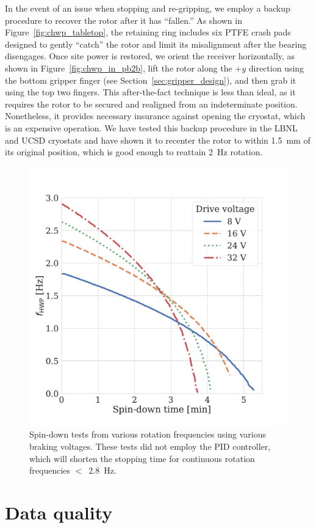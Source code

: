 In the event of an issue when stopping and re-gripping, we employ a backup procedure to recover the rotor after it has ``fallen.'' As shown in Figure~\ref{fig:chwp_tabletop}, the retaining ring includes six PTFE crash pads designed to gently ``catch'' the rotor and limit its misalignment after the bearing disengages. Once site power is restored, we orient the receiver horizontally, as shown in Figure~\ref{fig:chwp_in_pb2b}, lift the rotor along the $+y$ direction using the bottom gripper finger (see Section~\ref{sec:gripper_design}), and then grab it using the top two fingers. This after-the-fact technique is less than ideal, as it requires the rotor to be secured and realigned from an indeterminate position. Nonetheless, it provides necessary insurance against opening the cryostat, which is an expensive operation. We have tested this backup procedure in the LBNL and UCSD cryostats and have shown it to recenter the rotor to within 1.5~mm of its original position, which is good enough to reattain 2~Hz rotation.

\begin{figure}[!t]
    \centering
    \includegraphics[width=0.6\linewidth, trim=0.3cm 0.9cm 3.0cm 3.3cm, clip]{CHWPEvaluation/Figures/rotor_spindown_brake.pdf}
    \caption{Spin-down tests from various rotation frequencies using various braking voltages. These tests did not employ the PID controller, which will shorten the stopping time for continuous rotation frequencies $<$~2.8~Hz.}
    \label{fig:spin_down}
\end{figure}


\section{Data quality}
\label{sec:pb2b_chwp_data_quality}

